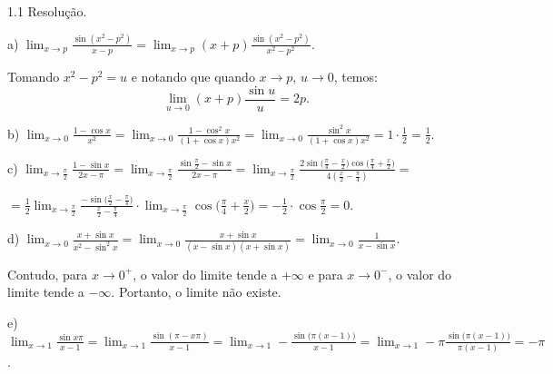 \documentclass{article}
\begin{document}
{\begin{newpage}
\par
\begin{flushleft}
1.1 Resolução.
\end{flushleft}
\par
a) $\displaystyle{\lim_{x\to p} \frac{\sin{(x^2 - p^2)}}{x-p} = \lim_{x\to p} (x+p)\frac{\sin{(x^2 - p^2)}}{x^2 - p^2}}$.
\par Tomando $x^2 - p^2 = u$ e notando que quando $x\rightarrow p$, $u\rightarrow 0$, temos:
\begin{equation*} \displaystyle{\lim_{u\to 0}} (x+p)\frac{\sin{u}}{u} = 2p. \end{equation*}
\vspace{0.3cm}
\par
b) $\displaystyle{\lim_{x\to 0} \frac{1 - \cos{x}}{x^2} = \lim_{x\to 0} \frac{1 - \cos^2{x}}{(1+\cos{x})x^2} = \lim_{x\to 0} \frac{\sin^2{x}}{(1+\cos{x})x^2} = 1\cdot \frac{1}{2} = \frac{1}{2}}$.
\par
\vspace{0.3cm}
c) $\displaystyle{\lim_{x\to \frac{\pi }{2}} \frac{1 - \sin{x}}{2x-\pi } = \lim_{x\to \frac{\pi }{2}} \frac{\sin{\frac{\pi }{2}} - \sin{x}}{2x-\pi } = \lim_{x\to \frac{\pi }{2}} \frac{2\sin{\Big(\frac{\pi }{4} - \frac{x}{2}\Big)}\cos{\Big(\frac{\pi }{4} + \frac{x}{2}\Big)}}{4(\frac{x}{2}-\frac{\pi }{4})} =}$\par$\displaystyle{=\frac{1}{2} \lim_{x\to \frac{\pi }{2}} \frac{-\sin{\Big(\frac{x}{2} - \frac{\pi }{4}}\Big)}{\frac{x}{2} - \frac{\pi }{4}}\cdot \lim_{x\to \frac{\pi }{2}} \cos{\Big(\frac{\pi }{4} + \frac{x}{2}\Big)} = -\frac{1}{2}\cdot \cos{\frac{\pi }{2}}=0}$.
\par
\vspace{0.3cm}
d) $\displaystyle{\lim_{x\to 0} \frac{x + \sin{x}}{x^2 - \sin^{2}{x}} = \lim_{x\to 0} \frac{x + \sin{x}}{(x - \sin{x})(x + \sin{x})} = \lim_{x\to 0} \frac{1}{x - \sin{x}}}$.
\par
\vspace{0.3cm}Contudo, para $x\rightarrow 0^{+}$, o valor do limite tende a $+\infty $ e para $x\rightarrow 0^{-}$, o valor do limite tende a $-\infty $. Portanto, o limite não existe.
\par
\vspace{0.3cm}
e) $\displaystyle{\lim_{x\to 1} \frac{\sin{x\pi }}{x-1} = \lim_{x\to 1}\frac{\sin{(\pi - x\pi )}}{x-1} = \lim_{x\to 1} -\frac{\sin{\Big(\pi (x-1)\Big)}}{x-1} = \lim_{x\to 1} -\pi \frac{\sin{\Big(\pi (x-1)\Big)}}{\pi (x-1)} = -\pi }$.
\par
\vspace{0.3cm}

\end{newpage}}
\end{document}
